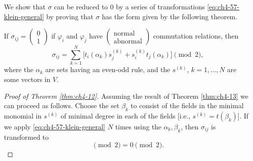 We show that $\sigma$ can be reduced to 0 by a series of transformations
\eqref{eq:ch4-57-klein-general} by proving that $\sigma$ has the form given by the following theorem.

\begin{theorem}[4-13]\label{thm:ch4-13}

If $\sigma_{ij}=\left(\begin{smallmatrix}0\\1\end{smallmatrix}\right)$ if
$\varphi_i$ and $\varphi_j$ have
$\left(\begin{smallmatrix}\text{normal}\\\text{abnormal}\end{smallmatrix}\right)$
commutation relations, then
\begin{equation}
  \sigma_{ij}=\sum_{k=1}^{N}
  \bigl[t_i(\alpha_k)s_j^{(k)}+s_i^{(k)}t_j(\alpha_k)\bigr]\pmod 2,
  \tag{4-63}\label{eq:ch4-63-sigma-decomposition}
\end{equation}
where the $\alpha_k$ are sets having an even-odd rule, and the $s^{(k)}$,
$k=1,\ldots,N$ are some vectors in $V$.
\end{theorem}

\begin{proof}[Proof of Theorem \ref{thm:ch4-12}]

Assuming the result of Theorem \ref{thm:ch4-13} we can proceed as follows.  Choose the set
$\beta_k$ to consist of the fields in the minimal monomial in $s^{(k)}$ of
minimal degree in each of the fields [i.e., $s^{(k)}=t(\beta_k)$].  If we
apply \eqref{eq:ch4-57-klein-general} $N$ times using the $\alpha_k,\beta_k$, then $\sigma_{ij}$ is
transformed to
\begin{equation*}
  [\sigma_{ij}+\sigma_{ij}]\pmod 2=0\pmod 2.
\end{equation*}
\end{proof}


